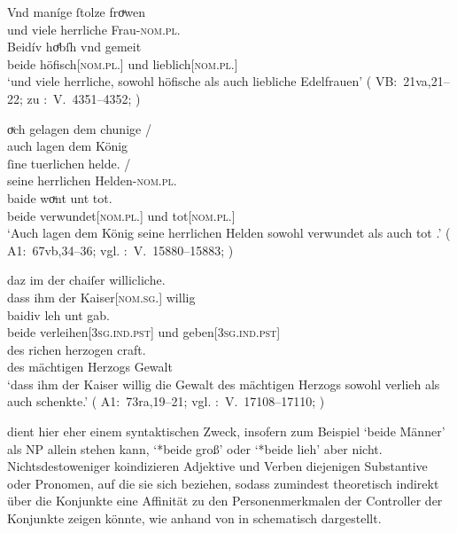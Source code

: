 \largerpage %
\begin{exe}
\ex \begin{xlist}
	\ex\label{ex:konjattradj}
		\gll Vnd maníge ſtolze froͮwen \\
			und viele herrliche Frau-\textsc{nom.pl.\FemF} \\%
	\sn \gll Beidív hoͤbſh vnd gemeit \\
			beide höfisch[\textsc{nom.pl.\FemF}] und lieblich[\textsc{nom.pl.\FemF}] \\
		\trans `und viele herrliche, sowohl höfische als auch liebliche Edelfrauen'
			(%
				VB:~21va,21--22; zu
				\KC:~V.~4351--4352;
				\cite[161]{schroeder1895}%
			)

	\ex \label{ex:konjcopredadj}
		\gll oͮch gelagen dem chunige {/} \\
			auch lagen dem König \\
		\gll ſine tuerlichen helde. {/} \\
			seine herrlichen Helden-\textsc{nom.pl.\MascM} \\
		\gll baide woͮnt unt tot. \\
			beide verwundet[\textsc{nom.pl.\MascM}] und tot[\textsc{nom.pl.\MascM}] \\
		\trans `Auch lagen dem König seine herrlichen Helden sowohl verwundet als auch tot .'
			(%
				A1:~67vb,34--36; vgl.
				\KC:~V.~15880--15883;
				\cite[368]{schroeder1895}%
			)

	\ex \label{ex:konjvb}
		\gll daz im der chaiſer willicliche. \\
			dass ihm der Kaiser[\textsc{nom.sg.\MascM}] willig \\
	\sn \gll baidiv leh unt gab. \\
			beide verleihen[\textsc{3sg\subM.ind.pst}] und
			geben[\textsc{3sg\subM.ind.pst}] \\
	\sn \gll des richen herzogen craft. \\
			des mächtigen Herzogs Gewalt \\
		\trans `dass ihm der Kaiser willig die Gewalt des mächtigen Herzogs sowohl verlieh als auch schenkte.'
			(%
				A1:~73ra,19--21; vgl.
				\KC:~V.~17108--17110;
				\cite[389]{schroeder1895}%
			)
	\end{xlist}
\end{exe}

 dient hier eher einem syntaktischen Zweck, insofern zum
Beispiel  `beide Männer' als NP allein stehen
kann,  `*beide groß' oder  `*beide lieh'
aber nicht. Nichtsdestoweniger koindizieren Adjektive
und Verben diejenigen Substantive oder Pronomen, auf die sie sich beziehen,
sodass  zumindest theoretisch indirekt über die Konjunkte eine
Affinität zu den Personenmerkmalen der Controller der
Konjunkte zeigen könnte, wie anhand von  in
 schematisch dargestellt.

